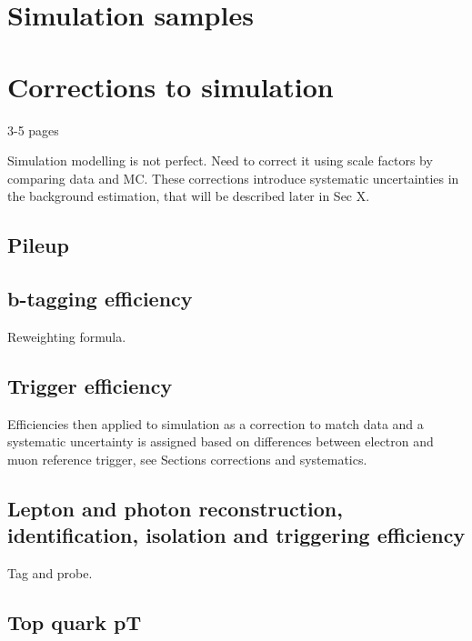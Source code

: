 


\section{Simulation samples}
\label{sec:analysis-mcsamples}




\section{Corrections to simulation}
\label{sec:analysis-mccorrections}
3-5 pages

Simulation modelling is not perfect. Need to correct it using scale factors by 
comparing data and MC. These corrections introduce systematic uncertainties in 
the background estimation, that will be described later in Sec X.

\subsection{Pileup}
\subsection{b-tagging efficiency}
Reweighting formula.
\subsection{Trigger efficiency}
Efficiencies then applied to simulation as a correction to match data and a 
systematic uncertainty is assigned based on differences between electron and 
muon reference trigger, see Sections corrections and systematics.
\subsection{Lepton and photon reconstruction, identification, isolation and 
triggering efficiency}
Tag and probe.
\subsection{Top quark pT}
